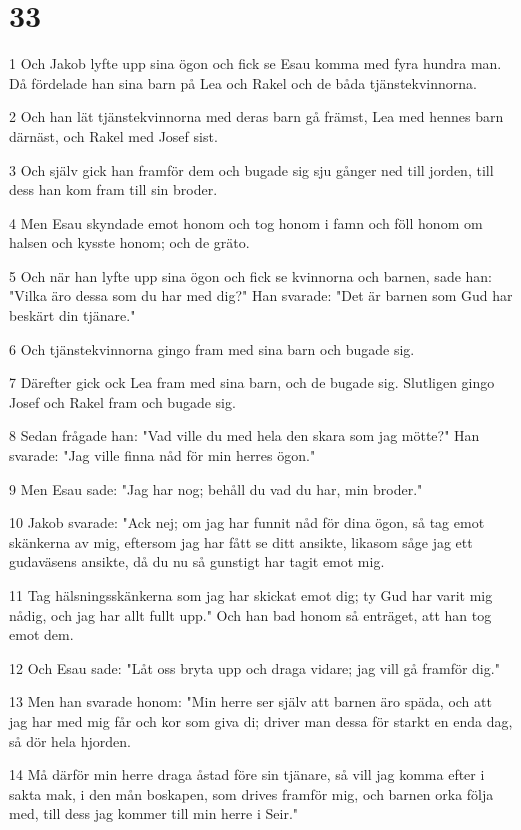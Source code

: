 \chapter{33}

\par 1 Och Jakob lyfte upp sina ögon och fick se Esau komma med fyra hundra man. Då fördelade han sina barn på Lea och Rakel och de båda tjänstekvinnorna.
\par 2 Och han lät tjänstekvinnorna med deras barn gå främst, Lea med hennes barn därnäst, och Rakel med Josef sist.
\par 3 Och själv gick han framför dem och bugade sig sju gånger ned till jorden, till dess han kom fram till sin broder.
\par 4 Men Esau skyndade emot honom och tog honom i famn och föll honom om halsen och kysste honom; och de gräto.
\par 5 Och när han lyfte upp sina ögon och fick se kvinnorna och barnen, sade han: "Vilka äro dessa som du har med dig?" Han svarade: "Det är barnen som Gud har beskärt din tjänare."
\par 6 Och tjänstekvinnorna gingo fram med sina barn och bugade sig.
\par 7 Därefter gick ock Lea fram med sina barn, och de bugade sig. Slutligen gingo Josef och Rakel fram och bugade sig.
\par 8 Sedan frågade han: "Vad ville du med hela den skara som jag mötte?" Han svarade: "Jag ville finna nåd för min herres ögon."
\par 9 Men Esau sade: "Jag har nog; behåll du vad du har, min broder."
\par 10 Jakob svarade: "Ack nej; om jag har funnit nåd för dina ögon, så tag emot skänkerna av mig, eftersom jag har fått se ditt ansikte, likasom såge jag ett gudaväsens ansikte, då du nu så gunstigt har tagit emot mig.
\par 11 Tag hälsningsskänkerna som jag har skickat emot dig; ty Gud har varit mig nådig, och jag har allt fullt upp." Och han bad honom så enträget, att han tog emot dem.
\par 12 Och Esau sade: "Låt oss bryta upp och draga vidare; jag vill gå framför dig."
\par 13 Men han svarade honom: "Min herre ser själv att barnen äro späda, och att jag har med mig får och kor som giva di; driver man dessa för starkt en enda dag, så dör hela hjorden.
\par 14 Må därför min herre draga åstad före sin tjänare, så vill jag komma efter i sakta mak, i den mån boskapen, som drives framför mig, och barnen orka följa med, till dess jag kommer till min herre i Seir."
